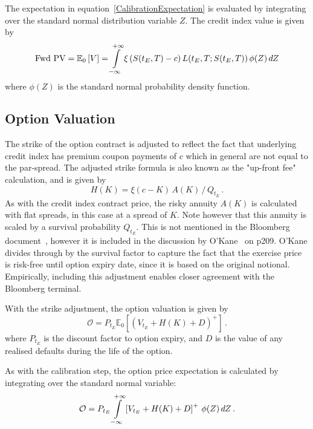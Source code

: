 \documentclass[11pt]{article}
\begin{document}
The expectation in equation~\ref{CalibrationExpectation} is evaluated by integrating over the standard normal distribution variable $Z$. The credit index value is given by
\begin{equation}
\mbox{Fwd PV} = \mathbb{E}_0 \left[ V \right] = \int \displaylimits_{-\infty}^{+\infty} 
	\xi \left( S(t_E,T)  - c\right) L(t_E,T; S(t_E,T)) \,
	\phi(Z) \, dZ
\label{calibrationIntegral}	
\end{equation}
where $\phi(Z)$ is the standard normal probability density function.

\subsection{Option Valuation}

The strike of the option contract is adjusted to reflect the fact that underlying credit index has premium coupon payments of $c$ which in general are not equal to the par-spread. The adjusted strike formula is also known as the "up-front fee" calculation, and is given by
\begin{equation}
H(K) = \xi ( c - K )  \, A(K) \, / \, Q_{t_E} \,.
\label{adjustedStrike}
\end{equation}
As with the credit index contract price, the risky annuity $A(K)$ is calculated with flat spreads, in this case at a spread of $K$. Note however that this annuity is scaled by a survival probability $Q_{t_E}$. This is not mentioned in the Bloomberg document~\cite{BloombergCreditIndexOption}, however it is included in the discussion by O'Kane~\cite{DominicOKane} on p209. O'Kane divides through by the survival factor to capture the fact that the exercise price is risk-free until option expiry date, since it is based on the original notional. Empirically, including this adjustment enables closer agreement with the Bloomberg terminal.

With the strike adjustment, the option valuation is given by
\begin{equation}
\mathcal{O} = P_{t_E} \mathbb{E}_0 \left[ ( V_{t_E} + H(K) + D )^+ \right] \,.
\end{equation}
where $P_{t_E}$ is the discount factor to option expiry, and $D$ is the value of any realised defaults during the life of the option.

As with the calibration step, the option price expectation is calculated by integrating over the standard normal variable:
\begin{equation}
\mathcal{O} = P_{t_E}\int \displaylimits_{-\infty}^{+\infty} 
\left[ V_{t_E} + H(K) + D \right]^+ \, 
\phi(Z) \, dZ \,.
\label{optionIntegral}
\end{equation}
\end{document}
